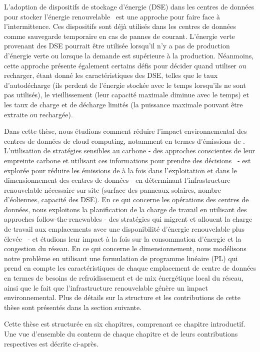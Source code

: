 L'adoption de dispositifs de stockage d'énergie (DSE) dans les centres de données pour stocker l'énergie renouvelable~\cite{wang2012_EDCS} est une approche pour faire face à l'intermittence. Ces dispositifs sont déjà utilisés dans les centres de données comme sauvegarde temporaire en cas de pannes de courant. L'énergie verte provenant des DSE pourrait être utilisée lorsqu'il n'y a pas de production d'énergie verte ou lorsque la demande est supérieure à la production. Néanmoins, cette approche présente également certains défis pour décider quand utiliser ou recharger, étant donné les caractéristiques des DSE, telles que le taux d'autodécharge (ils perdent de l'énergie stockée avec le temps lorsqu'ils ne sont pas utilisés), le vieillissement (leur capacité maximale diminue avec le temps) et les taux de charge et de décharge limités (la puissance maximale pouvant être extraite ou rechargée).



Dans cette thèse, nous étudions comment réduire l'impact environnemental des centres de données de cloud computing, notamment en termes d'émissions de . L'utilisation de stratégies sensibles au carbone - des approches conscientes de leur empreinte carbone et utilisant ces informations pour prendre des décisions~\cite{schooler2021carbonaware} - est explorée pour réduire les émissions de  à la fois dans l'exploitation et dans le dimensionnement des centres de données - en déterminant l'infrastructure renouvelable nécessaire sur site (surface des panneaux solaires, nombre d'éoliennes, capacité des DSE). En ce qui concerne les opérations des centres de données, nous exploitons la planification de la charge de travail en utilisant des approches follow-the-renewables - des stratégies qui migrent et allouent la charge de travail aux emplacements avec une disponibilité d'énergie renouvelable plus élevée~\cite{shuja2016sustainable} - et étudions leur impact à la fois sur la consommation d'énergie et la congestion du réseau. En ce qui concerne le dimensionnement, nous modélisons notre problème en utilisant une formulation de programme linéaire (PL) qui prend en compte les caractéristiques de chaque emplacement de centre de données en termes de besoins de refroidissement et de mix énergétique local du réseau, ainsi que le fait que l'infrastructure renouvelable génère un impact environnemental. Plus de détails sur la structure et les contributions de cette thèse sont présentés dans la section suivante.


Cette thèse est structurée en six chapitres, comprenant ce chapitre introductif. Une vue d'ensemble du contenu de chaque chapitre et de leurs contributions respectives est décrite ci-après.

